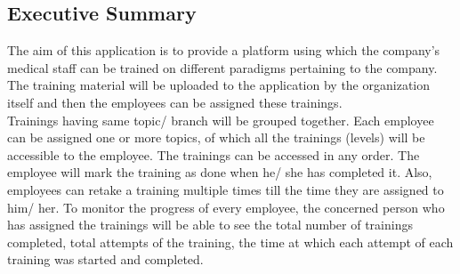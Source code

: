 \documentclass[a4paper,11pt]{article}
\begin{document}
\subsection{Executive Summary}
The aim of this application is to provide a platform using which the company’s medical staff can be trained on different paradigms pertaining to the company. The training material will be uploaded to the application by the organization itself and then the employees can be assigned these trainings.
\medskip\\ 
Trainings having same topic/ branch will be grouped together. Each employee can be assigned one or more topics, of which all the trainings (levels) will be accessible to the employee. The trainings can be accessed in any order. The employee will mark the training as done when he/ she has completed it. Also, employees can retake a training multiple times till the time they are assigned to him/ her. To monitor the progress of every employee, the concerned person who has assigned the trainings will be able to see the total number of trainings completed, total attempts of the training, the time at which each attempt of each training was started and completed.
\end{document}
